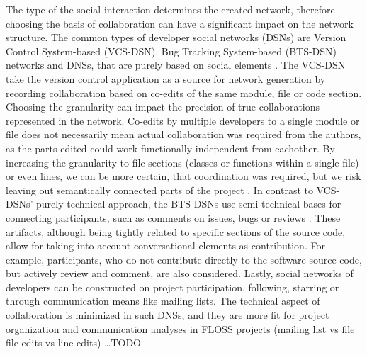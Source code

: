 The type of the social interaction determines the created network, therefore choosing the basis of collaboration can have a significant impact on the network structure. The common types of developer social networks (DSNs) are Version Control System-based (VCS-DSN), Bug Tracking System-based (BTS-DSN) networks and DNSs, that are purely based on social elements \cite{aljemabiEmpiricalStudyEvolution2018}. The VCS-DSN take the version control application as a source for network generation by recording collaboration based on co-edits of the same module, file or code section. Choosing the granularity can impact the precision of true collaborations represented in the network. Co-edits by multiple developers to a single module or file does not necessarily mean actual collaboration was required from the authors, as the parts edited could work functionally independent from eachother. By increasing the granularity to file sections (classes or functions within a single file) or even lines, we can be more certain, that coordination was required, but we risk leaving out semantically connected parts of the project \cite{joblinEvolutionaryTrendsDeveloper2017}. In contrast to VCS-DSNs' purely technical approach, the BTS-DSNs use semi-technical bases for connecting participants, such as comments on issues, bugs or reviews \cite{elasriPeripheryCoreTemporal2017}. These artifacts, although being tightly related to specific sections of the source code, allow for taking into account conversational elements as contribution. For example, participants, who do not contribute directly to the software source code, but actively review and comment, are also considered. Lastly, social networks of developers can be constructed on project participation, following, starring or through communication means like mailing lists. The technical aspect of collaboration is minimized in such DNSs, and they are more fit for project organization and communication analyses in FLOSS projects (mailing list vs file file edits vs line edits) \dots TODO





